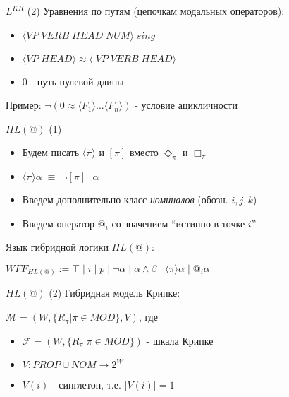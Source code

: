 \documentclass{beamer}
\begin{document}
\begin{frame}{$L^{KR}$ (2)}
Уравнения по путям (цепочкам модальных операторов):\\
\bigskip
\begin{itemize}
	\item $\langle VP \; VERB \; HEAD \; NUM \rangle \; sing$
	\item $\langle VP \; HEAD \rangle \approx \langle \; VP \; VERB \; HEAD \rangle$
	\item $0$ - путь нулевой длины
\end{itemize}
\bigskip
Пример: $\neg(0 \approx \langle F_1 \rangle ... \langle F_n \rangle)$ - условие ацикличности
\end{frame}

\begin{frame}{$HL(@)$ (1)}
\begin{itemize}
	\item Будем писать $\langle \pi \rangle$ и $[\pi]$ вместо $\Diamond_\pi$ и $\Box_\pi$
	\item $\langle \pi \rangle \alpha \; \equiv \; \neg [\pi] \neg \alpha$
	\item Введем дополнительно класс \textit{номиналов} (обозн. $i, j, k$)
	\item Введем оператор $@_i$ со значением ``истинно в точке $i$''
\end{itemize}
\bigskip
Язык гибридной логики $HL(@)$:\\
\begin{center}
$WFF_{HL(@)} := \top \; \vert \; i \; \vert \; p \; \vert \; \neg \alpha \; | \; \alpha \wedge \beta \; \vert \; \langle \pi \rangle \alpha \; \vert \; @_i \alpha$
\end{center}
\end{frame}

\begin{frame}{$HL(@)$ (2)}
Гибридная модель Крипке:\\
\bigskip
\begin{center}
$\mathcal{M} = (W, \{R_\pi \vert \pi \in MOD\}, V)$, где\\
\bigskip
\begin{itemize}
	\item $\mathcal{F} = (W, \{R_\pi \vert \pi \in MOD\})$ - шкала Крипке
	\item $V : PROP \cup NOM \to 2^W$
	\item $V(i)$ - синглетон, т.е. $\vert V(i) \vert = 1$
\end{itemize}
\end{center}
\end{frame}
\end{document}
